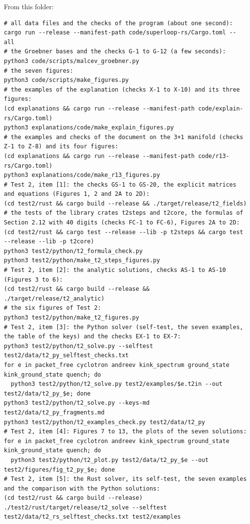 \documentclass[
  10pt,
]{article}
\begin{document}
From this folder:

\begin{verbatim}
# all data files and the checks of the program (about one second):
cargo run --release --manifest-path code/superloop-rs/Cargo.toml -- all
# the Groebner bases and the checks G-1 to G-12 (a few seconds):
python3 code/scripts/malcev_groebner.py
# the seven figures:
python3 code/scripts/make_figures.py
# the examples of the explanation (checks X-1 to X-10) and its three figures:
(cd explanations && cargo run --release --manifest-path code/explain-rs/Cargo.toml)
python3 explanations/code/make_explain_figures.py
# the examples and checks of the document on the 3+1 manifold (checks Z-1 to Z-8) and its four figures:
(cd explanations && cargo run --release --manifest-path code/r13-rs/Cargo.toml)
python3 explanations/code/make_r13_figures.py
# Test 2, item [1]: the checks GS-1 to GS-20, the explicit matrices and equations (Figures 1, 2 and 2A to 2D):
(cd test2/rust && cargo build --release && ./target/release/t2_fields)
# the tests of the library crates t2steps and t2core, the formulas of Section 2.12 with 40 digits (checks FC-1 to FC-6), Figures 2A to 2D:
(cd test2/rust && cargo test --release --lib -p t2steps && cargo test --release --lib -p t2core)
python3 test2/python/t2_formula_check.py
python3 test2/python/make_t2_steps_figures.py
# Test 2, item [2]: the analytic solutions, checks AS-1 to AS-10 (Figures 3 to 6):
(cd test2/rust && cargo build --release && ./target/release/t2_analytic)
# the six figures of Test 2:
python3 test2/python/make_t2_figures.py
# Test 2, item [3]: the Python solver (self-test, the seven examples, the table of the keys) and the checks EX-1 to EX-7:
python3 test2/python/t2_solve.py --selftest test2/data/t2_py_selftest_checks.txt
for e in packet_free cyclotron andreev kink_spectrum ground_state kink_ground_state quench; do
  python3 test2/python/t2_solve.py test2/examples/$e.t2in --out test2/data/t2_py_$e; done
python3 test2/python/t2_solve.py --keys-md test2/data/t2_py_fragments.md
python3 test2/python/t2_examples_check.py test2/data/t2_py
# Test 2, item [4]: Figures 7 to 13, the plots of the seven solutions:
for e in packet_free cyclotron andreev kink_spectrum ground_state kink_ground_state quench; do
  python3 test2/python/t2_plot.py test2/data/t2_py_$e --out test2/figures/fig_t2_py_$e; done
# Test 2, item [5]: the Rust solver, its self-test, the seven examples and the comparison with the Python solutions:
(cd test2/rust && cargo build --release)
./test2/rust/target/release/t2_solve --selftest test2/data/t2_rs_selftest_checks.txt test2/examples

\end{verbatim}
\end{document}
